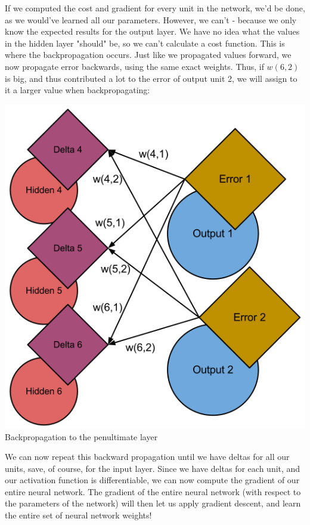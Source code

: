 \documentclass{article}
\begin{document}
If we computed the cost and gradient for every unit in the network, we'd be done, as we would've
learned all our parameters. However, we can't - because we only know the expected results for the
output layer. We have no idea what the values in the hidden layer "should" be, so we can't calculate
a cost function. This is where the backpropagation occurs. Just like we propagated values forward,
we now propagate error backwards, using the same exact weights. Thus, if $w(6,2)$ is big, and thus
contributed a lot to the error of output unit 2, we will assign to it a larger value when
backpropagating:

\begin{center}
    \includegraphics[scale=0.5]{images/backprop-2.png} \\
    Backpropagation to the penultimate layer
\end{center}

We can now repeat this backward propagation until we have deltas for all our units, save, of course,
for the input layer. Since we have deltas for each unit, and our activation function is
differentiable, we can now compute the gradient of our entire neural network. The gradient of the
entire neural network (with respect to the parameters of the network) will then let us apply
gradient descent, and learn the entire set of neural network weights!
\end{document}
